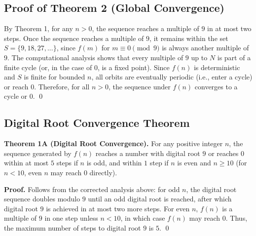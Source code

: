 \documentclass[12pt]{article}
\begin{document}
\subsection{Proof of Theorem 2 (Global Convergence)}
By Theorem 1, for any $n > 0$, the sequence reaches a multiple of $9$ in at most two steps. Once the sequence reaches a multiple of $9$, it remains within the set $S = \{9, 18, 27, ...\}$, since $f(m)$ for $m \equiv 0 \pmod{9}$ is always another multiple of $9$. The computational analysis shows that every multiple of $9$ up to $N$ is part of a finite cycle (or, in the case of $0$, is a fixed point). Since $f(n)$ is deterministic and $S$ is finite for bounded $n$, all orbits are eventually periodic (i.e., enter a cycle) or reach $0$. Therefore, for all $n > 0$, the sequence under $f(n)$ converges to a cycle or $0$.
\qed

\subsection{Digital Root Convergence Theorem}
\textbf{Theorem 1A (Digital Root Convergence).} For any positive integer $n$, the sequence generated by $f(n)$ reaches a number with digital root $9$ or reaches $0$ within at most $5$ steps if $n$ is odd, and within $1$ step if $n$ is even and $n \geq 10$ (for $n < 10$, even $n$ may reach $0$ directly).

\textbf{Proof.} Follows from the corrected analysis above: for odd $n$, the digital root sequence doubles modulo $9$ until an odd digital root is reached, after which digital root $9$ is achieved in at most two more steps. For even $n$, $f(n)$ is a multiple of $9$ in one step unless $n < 10$, in which case $f(n)$ may reach $0$. Thus, the maximum number of steps to digital root $9$ is $5$.
\qed
\end{document}
